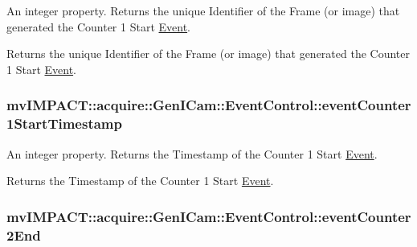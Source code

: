 An integer property. Returns the unique Identifier of the Frame (or image) that generated the Counter 1 Start \hyperlink{classmv_i_m_p_a_c_t_1_1acquire_1_1_event}{Event}. 

Returns the unique Identifier of the Frame (or image) that generated the Counter 1 Start \hyperlink{classmv_i_m_p_a_c_t_1_1acquire_1_1_event}{Event}. \hypertarget{classmv_i_m_p_a_c_t_1_1acquire_1_1_gen_i_cam_1_1_event_control_a6f840e03c44c57ec85ca2ae95938eef0}{
\subsubsection[{event\+Counter1\+Start\+Timestamp}]{ mv\+I\+M\+P\+A\+C\+T\+::acquire\+::\+Gen\+I\+Cam\+::\+Event\+Control\+::event\+Counter1\+Start\+Timestamp}}\label{classmv_i_m_p_a_c_t_1_1acquire_1_1_gen_i_cam_1_1_event_control_a6f840e03c44c57ec85ca2ae95938eef0}


An integer property. Returns the Timestamp of the Counter 1 Start \hyperlink{classmv_i_m_p_a_c_t_1_1acquire_1_1_event}{Event}. 

Returns the Timestamp of the Counter 1 Start \hyperlink{classmv_i_m_p_a_c_t_1_1acquire_1_1_event}{Event}. \hypertarget{classmv_i_m_p_a_c_t_1_1acquire_1_1_gen_i_cam_1_1_event_control_a44fad255babc1a2a2f4041b7325f0d88}{
\subsubsection[{event\+Counter2\+End}]{ mv\+I\+M\+P\+A\+C\+T\+::acquire\+::\+Gen\+I\+Cam\+::\+Event\+Control\+::event\+Counter2\+End}}\label{classmv_i_m_p_a_c_t_1_1acquire_1_1_gen_i_cam_1_1_event_control_a44fad255babc1a2a2f4041b7325f0d88}


